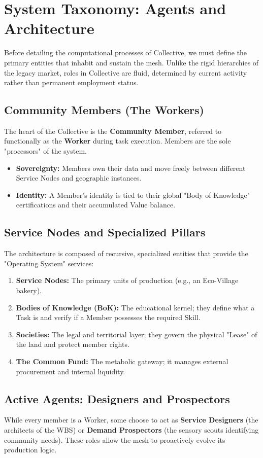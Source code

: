 \section{System Taxonomy: Agents and Architecture}

Before detailing the computational processes of Collective, we must define the primary entities that inhabit and sustain the mesh. Unlike the rigid hierarchies of the legacy market, roles in Collective are fluid, determined by current activity rather than permanent employment status.

\subsection{Community Members (The Workers)}
The heart of the Collective is the \textbf{Community Member}, referred to functionally as the \textbf{Worker} during task execution. Members are the sole "processors" of the system. 
\begin{itemize}[leftmargin=*]
    \item \textbf{Sovereignty:} Members own their data and move freely between different Service Nodes and geographic instances.
    \item \textbf{Identity:} A Member's identity is tied to their global "Body of Knowledge" certifications and their accumulated Value balance.
\end{itemize}

\subsection{Service Nodes and Specialized Pillars}
The architecture is composed of recursive, specialized entities that provide the "Operating System" services:
\begin{enumerate}
    \item \textbf{Service Nodes:} The primary units of production (e.g., an Eco-Village bakery).
    \item \textbf{Bodies of Knowledge (BoK):} The educational kernel; they define what a Task is and verify if a Member possesses the required Skill.
    \item \textbf{Societies:} The legal and territorial layer; they govern the physical "Lease" of the land and protect member rights.
    \item \textbf{The Common Fund:} The metabolic gateway; it manages external procurement and internal liquidity.
\end{enumerate}

\subsection{Active Agents: Designers and Prospectors}
While every member is a Worker, some choose to act as \textbf{Service Designers} (the architects of the WBS) or \textbf{Demand Prospectors} (the sensory scouts identifying community needs). These roles allow the mesh to proactively evolve its production logic.